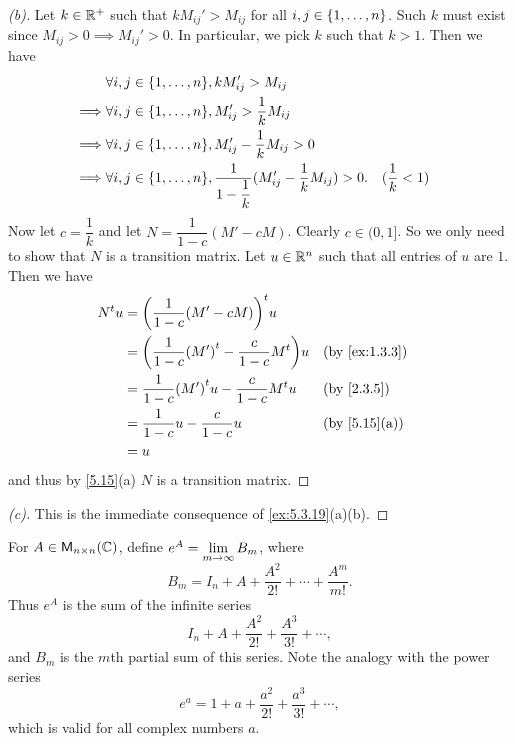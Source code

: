 \begin{proof}[(b)]
  Let \(k \in \mathbb{R}^+\) such that \(k M_{i j}' > M_{i j}\) for all \(i, j \in \left\lbrace1, \dots, n\right\rbrace\).
  Such \(k\) must exist since \(M_{i j} > 0 \implies M_{i j}' > 0\).
  In particular, we pick \(k\) such that \(k > 1\).
  Then we have
  \begin{align*}
             & \forall i, j \in \set{1, \dots, n}, k M_{i j}' > M_{i j}                                                                       \\
    \implies & \forall i, j \in \set{1, \dots, n}, M_{i j}' > \dfrac{1}{k} M_{i j}                                                            \\
    \implies & \forall i, j \in \set{1, \dots, n}, M_{i j}' - \dfrac{1}{k} M_{i j} > 0                                                        \\
    \implies & \forall i, j \in \set{1, \dots, n}, \dfrac{1}{1 - \dfrac{1}{k}} (M_{i j}' - \dfrac{1}{k} M_{i j}) > 0. &  & (\dfrac{1}{k} < 1)
  \end{align*}
  Now let \(c = \dfrac{1}{k}\) and let \(N = \dfrac{1}{1 - c} (M' - cM)\).
  Clearly \(c \in (0, 1]\).
  So we only need to show that \(N\) is a transition matrix.
  Let \(u \in \mathbb{R}^n\) such that all entries of \(u\) are \(1\).
  Then we have
  \begin{align*}
    \tp{N} u & = \tp{\pa{\dfrac{1}{1 - c} (M' - cM)}} u                                         \\
             & = \pa{\dfrac{1}{1 - c} \tp{(M')} - \dfrac{c}{1 - c} \tp{M}} u &  & \by{ex:1.3.3} \\
             & = \dfrac{1}{1 - c} \tp{(M')} u - \dfrac{c}{1 - c} \tp{M} u    &  & \by{2.3.5}    \\
             & = \dfrac{1}{1 - c} u - \dfrac{c}{1 - c} u                     &  & \by{5.15}[a]  \\
             & = u
  \end{align*}
  and thus by \cref{5.15}(a) \(N\) is a transition matrix.
\end{proof}

\begin{proof}[(c)]
  This is the immediate consequence of \cref{ex:5.3.19}(a)(b).
\end{proof}

\begin{defn}\label{5.3.18}
  For \(A \in \ms[n][n][\C]\), define \(e^A = \lim\limits_{m \to \infty} B_m\), where
  \[
    B_m = I_n + A + \dfrac{A^2}{2!} + \cdots + \dfrac{A^m}{m!}.
  \]
  Thus \(e^A\) is the sum of the infinite series
  \[
    I_n + A + \dfrac{A^2}{2!} + \dfrac{A^3}{3!} + \cdots,
  \]
  and \(B_m\) is the \(m\)th partial sum of this series.
  Note the analogy with the power series
  \[
    e^a = 1 + a + \dfrac{a^2}{2!} + \dfrac{a^3}{3!} + \cdots,
  \]
  which is valid for all complex numbers \(a\).
\end{defn}

